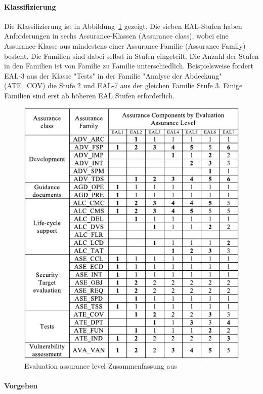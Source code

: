 \documentclass[11pt,a4paper]{report}
\begin{document}
\paragraph{Klassifizierung}

Die Klassifizierung ist in Abbildung~\ref{fig:eal_sum} gezeigt. Die sieben EAL-Stufen haben Anforderungen in sechs Assurance-Klassen (Assurance class), wobei eine Assurance-Klasse aus mindestens einer Assurance-Familie (Assurance Family) besteht. Die Familien sind dabei selbst in Stufen eingeteilt. Die Anzahl der Stufen in den Familien ist von Familie zu Familie unterschiedlich. Beispielsweise fordert EAL-3 aus der Klasse "Tests" in der Familie "Analyse der Abdeckung" (ATE\_COV) die Stufe 2 und EAL-7 aus der gleichen Familie Stufe 3. Einige Familien sind erst ab höheren EAL Stufen erforderlich. 

\begin{figure}[htb]
\centering
\includegraphics[scale=1.2]{images/cc_eal_table.pdf}
\caption[]{Evaluation assurance level Zusammenfassung aus \cite{bsi_ccguide}}
\label{fig:eal_sum}
\end{figure}

\paragraph{Vorgehen}
\end{document}
